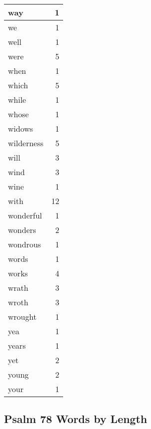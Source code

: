 \begin{center}
\begin{longtable}{l|r}
way & 1\\ \hline 
we & 1\\ \hline 
well & 1\\ \hline 
were & 5\\ \hline 
when & 1\\ \hline 
which & 5\\ \hline 
while & 1\\ \hline 
whose & 1\\ \hline 
widows & 1\\ \hline 
wilderness & 5\\ \hline 
will & 3\\ \hline 
wind & 3\\ \hline 
wine & 1\\ \hline 
with & 12\\ \hline 
wonderful & 1\\ \hline 
wonders & 2\\ \hline 
wondrous & 1\\ \hline 
words & 1\\ \hline 
works & 4\\ \hline 
wrath & 3\\ \hline 
wroth & 3\\ \hline 
wrought & 1\\ \hline 
yea & 1\\ \hline 
years & 1\\ \hline 
yet & 2\\ \hline 
young & 2\\ \hline 
your & 1\\ \hline 
\end{longtable}
\end{center}





\subsection{Psalm 78 Words by Length}


\normalsize
 
